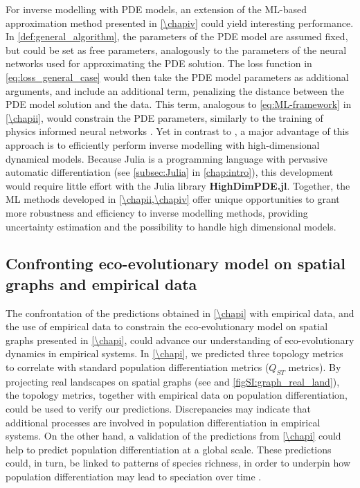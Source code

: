 For inverse modelling with PDE models, an extension of the ML-based approximation method presented in \cref{\chapiv} could yield interesting performance.
% 
In \cref{def:general_algorithm}, the parameters of the PDE model are assumed fixed, but could be set as free parameters, analogously to the parameters of the neural networks used for approximating the PDE solution. The loss function in \cref{eq:loss_general_case} would then take the PDE model parameters as additional arguments, and include an additional term, penalizing the distance between the PDE model solution and the data. This term, analogous to \cref{eq:ML-framework} in \cref{\chapii}, would constrain the PDE parameters, similarly to the training of physics informed neural networks \citep{Raissi2019,Yazdani2020}.
% 
Yet in contrast to \cite{Raissi2019,Yazdani2020}, a major advantage of this approach is to efficiently perform inverse modelling with high-dimensional dynamical models. Because Julia is a programming language with pervasive automatic differentiation (see \cref{subsec:Julia} in \cref{chap:intro}), this development would require little effort with the Julia library \textbf{HighDimPDE.jl}.
% 
Together, the ML methods developed in \cref{\chapii,\chapiv} offer unique opportunities to grant more robustness and efficiency to inverse modelling methods, providing uncertainty estimation and the possibility to handle high dimensional models.


\subsection{Confronting eco-evolutionary model on spatial graphs and empirical data}

The confrontation of the predictions obtained in \cref{\chapi} with empirical data, and the use of empirical data to constrain the eco-evolutionary model on spatial graphs presented in \cref{\chapi}, could advance our understanding of eco-evolutionary dynamics in empirical systems.
% 
In \cref{\chapi}, we predicted three topology metrics to correlate with standard population differentiation metrics ($Q_{ST}$ metrics). By projecting real landscapes on spatial graphs (see \cite{Dale2010} and \cref{figSI:graph_real_land}), the topology metrics, together with empirical data on population differentiation, could be used to verify our predictions. Discrepancies may indicate that additional processes are involved in population differentiation in empirical systems. On the other hand, a validation of the predictions from \cref{\chapi} could help to predict population differentiation at a global scale. These predictions could, in turn, be linked to patterns of species richness, in order to underpin how population differentiation may lead to speciation over time \citep{Templeton1981}.

